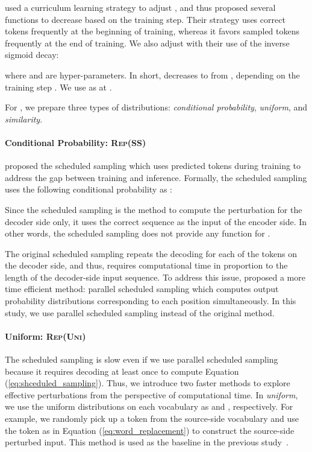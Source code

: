 \documentclass[11pt]{article}
\newcommand{\uniform}{\textsc{Rep(Uni)}}
\newcommand{\parass}{\textsc{Rep(SS)}}
\begin{document}
 used a curriculum learning strategy to adjust , and thus proposed several functions to decrease  based on the training step.
Their strategy uses correct tokens frequently at the beginning of training, whereas it favors sampled tokens frequently at the end of training.
We also adjust  with their use of the inverse sigmoid decay:

where  and  are hyper-parameters.
In short,  decreases to  from , depending on the training step .
We use  as  at .

For , we prepare three types of distributions: \textit{conditional probability}, \textit{uniform}, and \textit{similarity}.


\paragraph{Conditional Probability: \parass{}}
 proposed the scheduled sampling which uses predicted tokens during training to address the gap between training and inference.
Formally, the scheduled sampling uses the following conditional probability as :

Since the scheduled sampling is the method to compute the perturbation for the decoder side only, it uses the correct sequence as the input of the encoder side.
In other words, the scheduled sampling does not provide any function for .


The original scheduled sampling repeats the decoding for each of the tokens on the decoder side, and thus, requires computational time in proportion to the length of the decoder-side input sequence.
To address this issue,  proposed a more time efficient method: parallel scheduled sampling which computes output probability distributions corresponding to each position simultaneously.
In this study, we use parallel scheduled sampling instead of the original method.

\paragraph{Uniform: \uniform{}}
The scheduled sampling is slow even if we use parallel scheduled sampling because it requires decoding at least once to compute Equation (\ref{eq:shceduled_sampling}).
Thus, we introduce two faster methods to explore effective perturbations from the perspective of computational time.
In \textit{uniform}, we use the uniform distributions on each vocabulary as  and , respectively.
For example, we randomly pick up a token from the source-side vocabulary and use the token as  in Equation (\ref{eq:word_replacement}) to construct the source-side perturbed input.
This method is used as the baseline in the previous study~\cite{NIPS2015_5956}.
\end{document}
